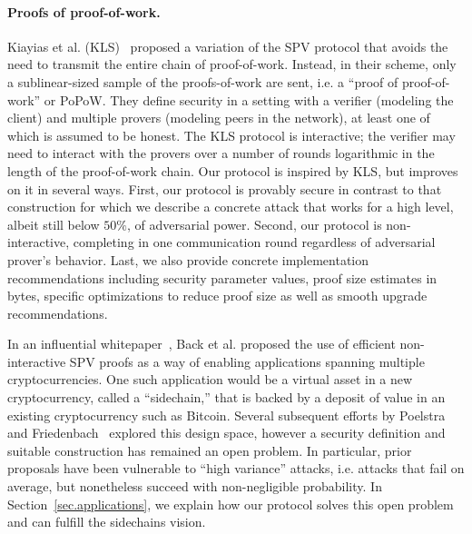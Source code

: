 \paragraph{Proofs of proof-of-work.}
Kiayias et al. (KLS)~\cite{KLS} proposed a variation of the SPV protocol that
avoids the need to transmit the entire chain of proof-of-work. Instead, in
their scheme, only a sublinear-sized sample of the proofs-of-work are sent, i.e.
a ``proof of proof-of-work'' or PoPoW. They define security in a setting with a
verifier (modeling the client) and multiple provers (modeling peers in the
network), at least one of which is assumed to be honest. The KLS protocol is
interactive; the verifier may need to interact with the provers over a number
of rounds logarithmic in the length of the proof-of-work chain.
Our protocol is inspired by KLS, but improves on it in several ways. First, our
protocol is  provably secure in contrast to that construction for which we
describe a concrete attack that works for a high level, albeit still below $50\%$,
of adversarial power. Second, our protocol is non-interactive, completing
in one communication round regardless of adversarial prover's behavior. Last, we
also provide concrete implementation recommendations including security
parameter values, proof size estimates in bytes, specific optimizations to
reduce proof size as well as smooth upgrade recommendations.

In an influential whitepaper~\cite{sidechains}, Back et al. proposed the
use of efficient non-interactive SPV proofs as a way of enabling applications
spanning multiple cryptocurrencies. One such application would be a virtual
asset in a new cryptocurrency, called a ``sidechain,'' that is backed by a
deposit of value in an existing cryptocurrency such as Bitcoin.
Several subsequent efforts by
Poelstra~\cite{pos} and Friedenbach~\cite{compactspv} explored this design
space, however a security definition and suitable construction has remained an
open problem. In particular, prior proposals have been vulnerable to ``high
variance'' attacks, i.e. attacks that fail on average, but nonetheless succeed
with non-negligible probability. In Section~\ref{sec.applications}, we explain
how our protocol solves this open problem and can fulfill the sidechains
vision.


